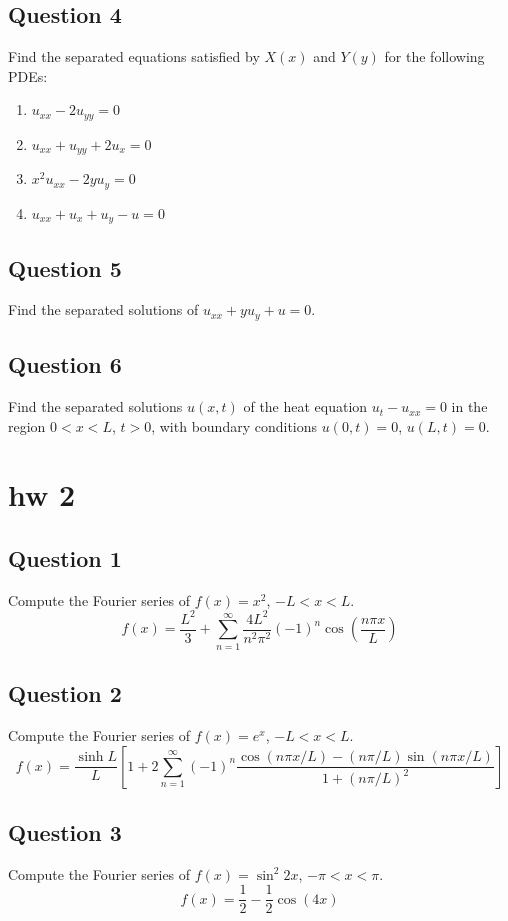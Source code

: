 \documentclass[lang=en,11pt]{template}
\begin{document}
\section*{Question 4}
Find the separated equations satisfied by $X(x)$ and $Y(y)$ for the following PDEs:
\begin{enumerate}
    \item $u_{xx} - 2u_{yy} = 0$
    \item $u_{xx} + u_{yy} + 2u_x = 0$
    \item $x^2u_{xx} - 2yu_y = 0$
    \item $u_{xx} + u_x + u_y - u = 0$
\end{enumerate}

\section*{Question 5}
Find the separated solutions of $u_{xx} + y u_y + u = 0$.

\section*{Question 6}
Find the separated solutions $u(x, t)$ of the heat equation $u_t - u_{xx} = 0$ in the region $0 < x < L$, $t > 0$, with boundary conditions $u(0, t) = 0$, $u(L, t) = 0$.




\chapter{hw 2}
\section*{Question 1}
Compute the Fourier series of $f(x) = x^2$, $-L < x < L$.
\[
f(x) = \frac{L^2}{3} + \sum_{n=1}^{\infty} \frac{4L^2}{n^2 \pi^2} (-1)^n \cos\left(\frac{n \pi x}{L}\right)
\]

\section*{Question 2}
Compute the Fourier series of $f(x) = e^x$, $-L < x < L$.
\[
f(x) = \frac{\sinh L}{L} \left[ 1 + 2 \sum_{n=1}^{\infty} (-1)^n \frac{\cos(n \pi x / L) - (n \pi / L) \sin(n \pi x / L)}{1 + (n \pi / L)^2} \right]
\]

\section*{Question 3}
Compute the Fourier series of $f(x) = \sin^2 2x$, $-\pi < x < \pi$.
\[
f(x) = \frac{1}{2} - \frac{1}{2} \cos(4x)
\]
\end{document}
